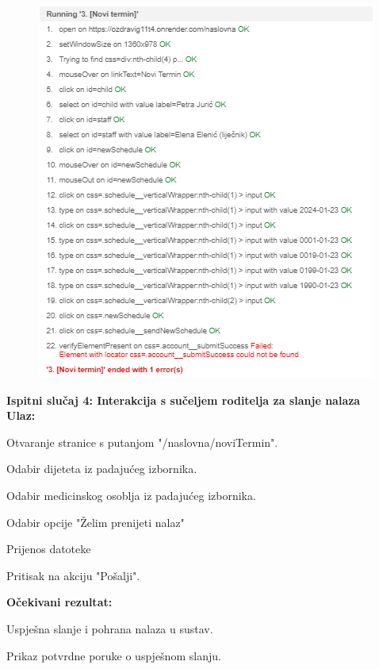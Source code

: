 \begin{figure}[H]
	\includegraphics[scale=0.6]{dijagrami/test33.PNG}
	\centering
	\label{fig:myChart}
\end{figure}



\noindent	\textbf{Ispitni slučaj 4: Interakcija s sučeljem roditelja za slanje nalaza}
\\
\noindent \textbf{Ulaz:}
\begin{packed_enum}
	\item Otvaranje stranice s putanjom "/naslovna/noviTermin".
	\item Odabir dijeteta iz padajućeg izbornika.
	\item Odabir medicinskog osoblja iz padajućeg izbornika.
	\item Odabir opcije "Želim prenijeti nalaz"
	\item Prijenos datoteke
	\item Pritisak na akciju "Pošalji".
\end{packed_enum}

\noindent \textbf{Očekivani rezultat:}
\begin{packed_enum}
	\item Uspješna slanje i pohrana nalaza u sustav.
	\item Prikaz potvrdne poruke o uspješnom slanju.
\end{packed_enum}

